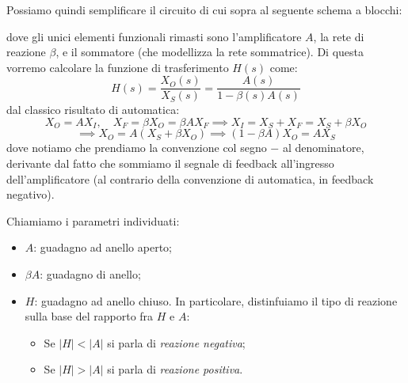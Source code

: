 \documentclass[a4paper,11pt]{article}
\begin{document}
Possiamo quindi semplificare il circuito di cui sopra al seguente schema a blocchi:

\begin{center}
\end{center}

dove gli unici elementi funzionali rimasti sono l'amplificatore $A$, la rete di reazione $\beta$, e il sommatore (che modellizza la rete sommatrice).
Di questa vorremo calcolare la funzione di trasferimento $H(s)$ come:
$$
H(s) = \frac{X_O(s)}{X_S(s)} = \frac{A(s)}{1 - \beta(s)A(s)}
$$
dal classico risultato di automatica:
$$
X_O = A X_I, \quad X_F = \beta X_O = \beta A X_F \implies X_I = X_S + X_F = X_S + \beta X_O
$$
$$
\implies X_O = A \left( X_S + \beta X_O \right) \implies (1 - \beta A) X_O = A X_S
$$
dove notiamo che prendiamo la convenzione col segno $-$ al denominatore, derivante dal fatto che sommiamo il segnale di feedback all'ingresso dell'amplificatore (al contrario della convenzione di automatica, in feedback negativo).

Chiamiamo i parametri individuati:
\begin{itemize}
	\item $A$: guadagno ad anello aperto;
	\item $\beta A$: guadagno di anello;
	\item $H$: guadagno ad anello chiuso. In particolare, distinfuiamo il tipo di reazione sulla base del rapporto fra $H$ e $A$:
		\begin{itemize}
			\item Se $|H| < |A|$ si parla di \textit{reazione negativa};
			\item Se $|H| > |A|$ si parla di \textit{reazione positiva}.
		\end{itemize}
\end{itemize}
\end{document}
